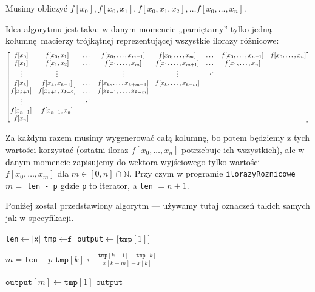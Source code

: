 \documentclass[10pt]{article}
\begin{document}
\noindent Musimy obliczyć $f[x_0], f[x_0,x_1], f[x_0, x_1, x_2], \dots f[x_0, \dots, x_n]$.

Idea algorytmu jest taka: w danym momencie „pamiętamy” tylko jedną kolumnę macierzy trójkątnej reprezentującej wszystkie ilorazy różnicowe:
$$
\begin{bmatrix}
    f[x_0] & f[x_0, x_1] & \dots & f[x_0, \dots, x_{m-1}] & f[x_0, \dots, x_m] & \dots & f[x_0, \dots, x_{n-1}] & f[x_0, \dots, x_n]\\
    f[x_1] & f[x_1, x_2] & \dots & f[x_1, \dots, x_m] & f[x_1, \dots, x_{m+1}]& \dots & f[x_1,\dots, x_n]\\
    \vdots & \vdots & & \vdots & \vdots & \reflectbox{$\ddots$}\\
    f[x_k] & f[x_k, x_{k+1}] & \dots & f[x_k, \dots, x_{k+m-1}] & f[x_k, \dots, x_{k+m}]\\
    f[x_{k+1}] & f[x_{k+1}, x_{k+2}] & \dots & f[x_{k+1}, \dots, x_{k+m}]\\
    \vdots && \reflectbox{$\ddots$}\\
    f[x_{n-1}] & f[x_{n-1}, x_n]\\
    f[x_n]
\end{bmatrix}
$$

Za każdym razem musimy wygenerować całą kolumnę, bo potem będziemy z tych wartości korzystać (ostatni iloraz $f[x_0,\dots,x_n]$ potrzebuje ich wszystkich), ale w danym momencie zapisujemy do wektora wyjściowego tylko wartości $f[x_0, \dots, x_m]$ dla $m \in [0, n] \cap \mathbb{N}$. Przy czym w programie \texttt{ilorazyRoznicowe} $m =$ \texttt{len - p} gdzie \texttt{p} to iterator, a \texttt{len} $= n+1$.

\noindent Poniżej został przedstawiony algorytm — używamy tutaj oznaczeń takich samych jak w \href{1.in-data}{specyfikacji}.
\begin{algorithm}[H]
    \begin{algorithmic}[1]
      \State \texttt{len}$ \gets |$\texttt{x}$|$\label{1.alg.begin.len}
      \State \texttt{tmp}$ \gets \texttt{f}$\label{1.alg.begin.f}
      \State \texttt{output}$ \gets \big[ \texttt{tmp}[1] \big]$\label{1.alg.begin.output}

      \label{1.alg.for.begin}
        \State $m = \texttt{len} - p$\label{1.alg.for.m}
        \label{1.alg.for.for.begin}
            \State $\texttt{tmp}[k] \gets \frac{\texttt{tmp}[k+1] - \texttt{tmp}[k]}{x[k + m] - x[k]}$\label{1.alg.for.for.expr}
        \EndFor

        \State $\texttt{output}[m] \gets \texttt{tmp}[1]$\label{1.alg.for.expr}
      \EndFor
      \State \Return $\texttt{output}$
    \end{algorithmic}
\end{algorithm}
\end{document}
